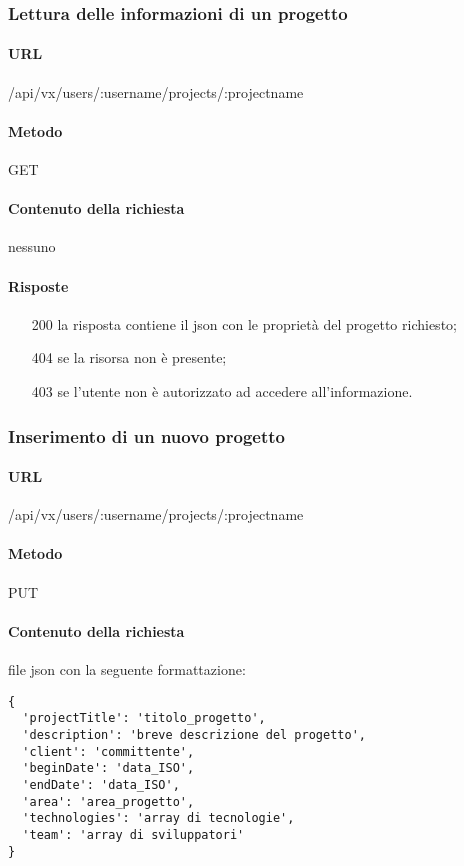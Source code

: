 \subsubsection{Lettura delle informazioni di un progetto}
\paragraph{URL}
/api/vx/users/:username/projects/:projectname
\paragraph{Metodo}
GET
\paragraph{Contenuto della richiesta}
nessuno
\paragraph{Risposte}
\begin{itemize}
	\item[200] la risposta contiene il \gls{json} con le proprietà del progetto richiesto;
	\item[404] se la risorsa non è presente;
	\item[403] se l'utente non è autorizzato ad accedere all'informazione.
\end{itemize}

\subsubsection{Inserimento di un nuovo progetto}
\paragraph{URL}
/api/vx/users/:username/projects/:projectname
\paragraph{Metodo}
PUT
\paragraph{Contenuto della richiesta}
file \gls{json} con la seguente formattazione:
\begin{verbatim}
{
  'projectTitle': 'titolo_progetto',
  'description': 'breve descrizione del progetto',
  'client': 'committente',
  'beginDate': 'data_ISO',
  'endDate': 'data_ISO',
  'area': 'area_progetto',
  'technologies': 'array di tecnologie',
  'team': 'array di sviluppatori'
}
\end{verbatim}
